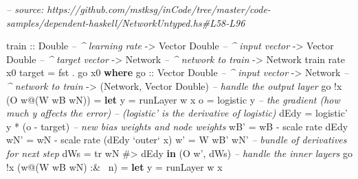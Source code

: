 \documentclass[]{article}
\newenvironment{Shaded}{}{}
\newcommand{\CommentTok}[1]{\textcolor[rgb]{0.38,0.63,0.69}{\textit{#1}}}
\newcommand{\DataTypeTok}[1]{\textcolor[rgb]{0.56,0.13,0.00}{#1}}
\newcommand{\FunctionTok}[1]{\textcolor[rgb]{0.02,0.16,0.49}{#1}}
\newcommand{\KeywordTok}[1]{\textcolor[rgb]{0.00,0.44,0.13}{\textbf{#1}}}
\newcommand{\NormalTok}[1]{#1}
\newcommand{\OtherTok}[1]{\textcolor[rgb]{0.00,0.44,0.13}{#1}}
\begin{document}
\begin{Shaded}
\begin{Highlighting}[]
\CommentTok{-- source: https://github.com/mstksg/inCode/tree/master/code-samples/dependent-haskell/NetworkUntyped.hs#L58-L96}

\OtherTok{train ::} \DataTypeTok{Double}           \CommentTok{-- ^ learning rate}
      \OtherTok{->} \DataTypeTok{Vector} \DataTypeTok{Double}    \CommentTok{-- ^ input vector}
      \OtherTok{->} \DataTypeTok{Vector} \DataTypeTok{Double}    \CommentTok{-- ^ target vector}
      \OtherTok{->} \DataTypeTok{Network}          \CommentTok{-- ^ network to train}
      \OtherTok{->} \DataTypeTok{Network}
\NormalTok{train rate x0 target }\FunctionTok{=}\NormalTok{ fst }\FunctionTok{.}\NormalTok{ go x0}
  \KeywordTok{where}
\OtherTok{    go ::} \DataTypeTok{Vector} \DataTypeTok{Double}    \CommentTok{-- ^ input vector}
       \OtherTok{->} \DataTypeTok{Network}          \CommentTok{-- ^ network to train}
       \OtherTok{->}\NormalTok{ (}\DataTypeTok{Network}\NormalTok{, }\DataTypeTok{Vector} \DataTypeTok{Double}\NormalTok{)}
    \CommentTok{-- handle the output layer}
\NormalTok{    go }\FunctionTok{!}\NormalTok{x (}\DataTypeTok{O}\NormalTok{ w}\FunctionTok{@}\NormalTok{(}\DataTypeTok{W}\NormalTok{ wB wN))}
        \FunctionTok{=} \KeywordTok{let}\NormalTok{ y    }\FunctionTok{=}\NormalTok{ runLayer w x}
\NormalTok{              o    }\FunctionTok{=}\NormalTok{ logistic y}
              \CommentTok{-- the gradient (how much y affects the error)}
              \CommentTok{--   (logistic' is the derivative of logistic)}
\NormalTok{              dEdy }\FunctionTok{=}\NormalTok{ logistic' y }\FunctionTok{*}\NormalTok{ (o }\FunctionTok{-}\NormalTok{ target)}
              \CommentTok{-- new bias weights and node weights}
\NormalTok{              wB'  }\FunctionTok{=}\NormalTok{ wB }\FunctionTok{-}\NormalTok{ scale rate dEdy}
\NormalTok{              wN'  }\FunctionTok{=}\NormalTok{ wN }\FunctionTok{-}\NormalTok{ scale rate (dEdy }\OtherTok{`outer`}\NormalTok{ x)}
\NormalTok{              w'   }\FunctionTok{=} \DataTypeTok{W}\NormalTok{ wB' wN'}
              \CommentTok{-- bundle of derivatives for next step}
\NormalTok{              dWs  }\FunctionTok{=}\NormalTok{ tr wN }\FunctionTok{#>}\NormalTok{ dEdy}
          \KeywordTok{in}\NormalTok{  (}\DataTypeTok{O}\NormalTok{ w', dWs)}
    \CommentTok{-- handle the inner layers}
\NormalTok{    go }\FunctionTok{!}\NormalTok{x (w}\FunctionTok{@}\NormalTok{(}\DataTypeTok{W}\NormalTok{ wB wN) }\FunctionTok{:&~}\NormalTok{ n)}
        \FunctionTok{=} \KeywordTok{let}\NormalTok{ y          }\FunctionTok{=}\NormalTok{ runLayer w x}

\end{Highlighting}
\end{Shaded}
\end{document}
